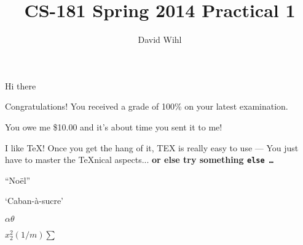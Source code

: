 \documentclass[11pt, oneside]{article}   	%
\title{CS-181 Spring 2014 Practical 1}
\author{David Wihl}
\begin{document}
\maketitle

Hi there

Congratulations! You received a grade of 100\% on your latest
examination.

You owe me \$10.00 and it's about time you sent it to me!


\par I like \TeX! Once you get the hang of it, TEX is really easy to use --- You just have to
master the \TeX nical aspects... \bf or else \rm try something \tt else \rm \dots

``No\"el''
\par
`Caban-\`a-sucre'
\par

$
\alpha\theta
$

$
x^2_2
(1/m)\sum
$
\end{document}
